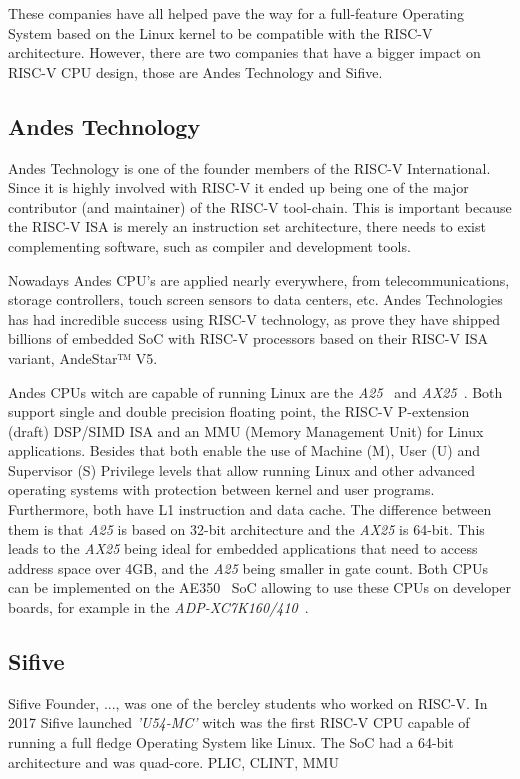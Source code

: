 These companies have all helped pave the way for a full-feature Operating System based on the Linux kernel to be compatible with the RISC-V architecture. However, there are two companies that have a bigger impact on RISC-V CPU design, those are Andes Technology and Sifive.

\subsection{Andes Technology}
Andes Technology is one of the founder members of the RISC-V International. Since it is highly involved with RISC-V it ended up being one of the major contributor (and maintainer) of the RISC-V tool-chain. This is important because the RISC-V ISA is merely an instruction set architecture, there needs to exist complementing software, such as compiler and development tools.

Nowadays Andes CPU's are applied nearly everywhere, from telecommunications, storage controllers, touch screen sensors to data centers, etc. Andes Technologies has had incredible success using RISC-V technology, as prove they have shipped billions of embedded SoC with RISC-V processors based on their RISC-V ISA variant, AndeStar™ V5. 

Andes CPUs witch are capable of running Linux are the \textit{A25}~\cite{a25} and \textit{AX25}~\cite{ax25}. Both support single and double precision floating point, the RISC-V P-extension (draft) DSP/SIMD ISA and an MMU (Memory Management Unit) for Linux applications. Besides that both enable the use of Machine (M), User (U) and Supervisor (S) Privilege levels that allow running Linux and other advanced operating systems with protection between kernel and user programs. Furthermore, both have L1 instruction and data cache. The difference between them is that \textit{A25} is based on 32-bit architecture and the \textit{AX25} is 64-bit. This leads to the \textit{AX25} being ideal for embedded applications that need to access address space over 4GB, and the \textit{A25} being smaller in gate count. Both CPUs can be implemented on the AE350~\cite{ae350} SoC allowing to use these CPUs on developer boards, for example in the \textit{ADP-XC7K160/410}~\cite{adp-xc7k160}.

\subsection{Sifive}
Sifive Founder, ..., was one of the bercley students who worked on RISC-V.
In 2017 Sifive launched \textit{'U54-MC'} witch was the first RISC-V CPU capable of running a full fledge Operating System like Linux. The SoC had a 64-bit architecture and was quad-core.
PLIC, CLINT, MMU


